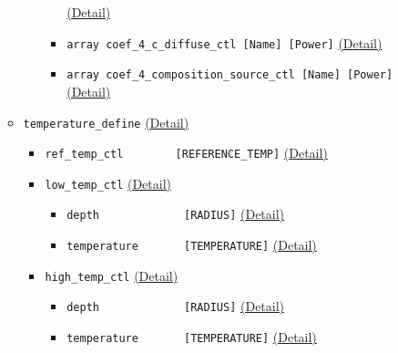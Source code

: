 \begin{itemize}
\begin{itemize}
\begin{itemize}
\begin{itemize}
		    		\hyperref[href_t:coef_4_composition_ctl]{(Detail)}
			\item \verb|array coef_4_c_diffuse_ctl [Name] [Power]|
		    		\hyperref[href_t:coef_4_c_diffuse_ctl]{(Detail)}
			\item \verb|array coef_4_composition_source_ctl [Name] [Power]|
		    		\hyperref[href_t:coef_4_composition_source_ctl]{(Detail)}
			\end{itemize}
		\end{itemize}
%
%
%
	\item \verb|temperature_define|
		\label{href_i:temperature_define}
    		\hyperref[href_t:temperature_define]{(Detail)}
		\begin{itemize}
		\item \verb|ref_temp_ctl        [REFERENCE_TEMP]|
	    		\hyperref[href_t:ref_temp_ctl]{(Detail)}
		\item \verb|low_temp_ctl|
	    		\hyperref[href_t:low_temp_ctl]{(Detail)}
			\begin{itemize}
			\item \verb|depth             [RADIUS]|
		    		\hyperref[href_t:depth]{(Detail)}
			\item \verb|temperature       [TEMPERATURE]|
		    		\hyperref[href_t:temperature]{(Detail)}
			\end{itemize}
%
		\item \verb|high_temp_ctl|
	    		\hyperref[href_t:high_temp_ctl]{(Detail)}
			\begin{itemize}
			\item \verb|depth             [RADIUS]|
		    		\hyperref[href_t:depth]{(Detail)}
			\item \verb|temperature       [TEMPERATURE]|
		    		\hyperref[href_t:temperature]{(Detail)}

\end{itemize}
\end{itemize}
\end{itemize}
\end{itemize}
